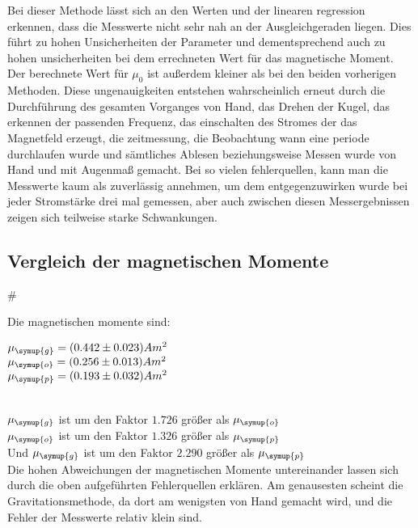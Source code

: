 Bei dieser Methode lässt sich an den Werten und der linearen regression erkennen, dass die Messwerte nicht sehr nah an der Ausgleichgeraden liegen. Dies führt zu hohen Unsicherheiten der Parameter und dementsprechend auch zu hohen unsicherheiten bei dem errechneten Wert
für das magnetische Moment. Der berechnete Wert für $\mu_0$ ist außerdem kleiner als bei den beiden vorherigen Methoden.
Diese ungenauigkeiten entstehen wahrscheinlich erneut durch die Durchführung des gesamten Vorganges von Hand, das Drehen der Kugel, das erkennen der passenden Frequenz, das einschalten des Stromes der das Magnetfeld erzeugt, die zeitmessung, die Beobachtung wann eine periode durchlaufen wurde und sämtliches Ablesen beziehungsweise Messen wurde von Hand und mit Augenmaß
gemacht. Bei so vielen fehlerquellen, kann man die Messwerte kaum als zuverlässig annehmen, um dem entgegenzuwirken wurde bei jeder Stromstärke drei mal gemessen, aber auch zwischen diesen Messergebnissen zeigen sich teilweise starke Schwankungen.

\subsection{Vergleich der magnetischen Momente}#

Die magnetischen momente sind:\\

\begin{centering}
$\mu_{\symup{g}} = (0.442 \pm 0.023) Am^2$\\
$\mu_{\symup{o}} = (0.256 \pm 0.013) Am^2$\\
$\mu_{\symup{p}} = (0.193 \pm 0.032) Am^2$\\

\end{centering}
\\
$\mu_{\symup{g}}$ ist um den Faktor $1.726$ größer als $\mu_{\symup{o}}$\\
$\mu_{\symup{o}}$ ist um den Faktor $1.326$ größer als $\mu_{\symup{p}}$\\
Und $\mu_{\symup{g}}$ ist um den Faktor $2.290$ größer als $\mu_{\symup{p}}$\\

Die hohen Abweichungen der magnetischen Momente untereinander lassen sich durch die oben aufgeführten Fehlerquellen erklären.
Am genausesten scheint die Gravitationsmethode, da dort am wenigsten von Hand gemacht wird, und die Fehler der Messwerte relativ klein sind.
